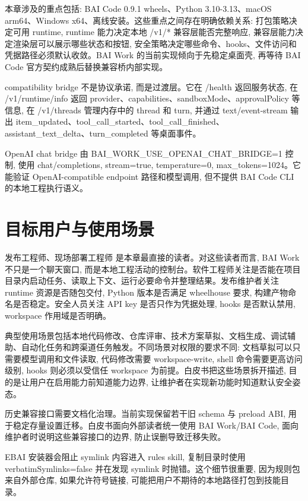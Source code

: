 本章涉及的重点包括: BAI Code 0.9.1 wheels、Python 3.10-3.13、macOS arm64、Windows x64、离线安装。这些重点之间存在明确依赖关系: 打包策略决定可用 runtime, runtime 能力决定本地 /v1/* 兼容层能否完整响应, 兼容层能力决定渲染层可以展示哪些状态和按钮, 安全策略决定哪些命令、hooks、文件访问和凭据路径必须默认收敛。BAI Work 的当前实现倾向于先稳定桌面壳, 再等待 BAI Code 官方契约成熟后替换兼容桥内部实现。

compatibility bridge 不是协议承诺, 而是过渡层。它在 /health 返回服务状态, 在 /v1/runtime/info 返回 provider、capabilities、sandboxMode、approvalPolicy 等信息, 在 /v1/threads 管理内存中的 thread 和 turn, 并通过 text/event-stream 输出 item\_updated、tool\_call\_started、tool\_call\_finished、assistant\_text\_delta、turn\_completed 等桌面事件。

OpenAI chat bridge 由 BAI\_WORK\_USE\_OPENAI\_CHAT\_BRIDGE=1 控制, 使用 chat/completions, stream=true, temperature=0, max\_tokens=1024。它能验证 OpenAI-compatible endpoint 路径和模型调用, 但不提供 BAI Code CLI 的本地工程执行语义。

\section{目标用户与使用场景}
发布工程师、现场部署工程师 是本章最直接的读者。对这些读者而言, BAI Work 不只是一个聊天窗口, 而是本地工程活动的控制台。软件工程师关注是否能在项目目录内启动任务、读取上下文、运行必要命令并整理结果。发布维护者关注 runtime 资源是否随包交付, Python 版本是否满足 wheelhouse 要求, 构建产物命名是否稳定。安全人员关注 API key 是否只作为凭据处理, hooks 是否默认禁用, workspace 作用域是否明确。

典型使用场景包括本地代码修改、仓库评审、技术方案草拟、文档生成、调试辅助、自动化任务和跨渠道任务触发。不同场景对权限的要求不同: 文档草拟可以只需要模型调用和文件读取, 代码修改需要 workspace-write, shell 命令需要更高访问级别, hooks 则必须以受信任 workspace 为前提。白皮书把这些场景拆开描述, 目的是让用户在启用能力前知道能力边界, 让维护者在实现新功能时知道默认安全姿态。

历史兼容接口需要文档化治理。当前实现保留若干旧 schema 与 preload ABI, 用于稳定存量设置迁移。白皮书面向外部读者统一使用 BAI Work/BAI Code, 面向维护者时说明这些兼容接口的边界, 防止误删导致迁移失败。

EBAI 安装器会阻止 symlink 内容进入 rules skill, 复制目录时使用 verbatimSymlinks=false 并在发现 symlink 时抛错。这个细节很重要, 因为规则包来自外部仓库, 如果允许符号链接, 可能把用户不期待的本地路径打包到技能目录。

